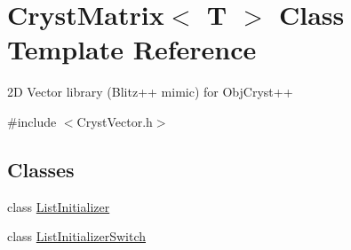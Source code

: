 \hypertarget{class_cryst_matrix}{}\section{Cryst\+Matrix$<$ T $>$ Class Template Reference}
\label{class_cryst_matrix}


2D Vector library (Blitz++ mimic) for Obj\+Cryst++  




{\ttfamily \#include $<$Cryst\+Vector.\+h$>$}

\subsection*{Classes}
\begin{DoxyCompactItemize}
\item 
class \mbox{\hyperlink{class_cryst_matrix_1_1_list_initializer}{List\+Initializer}}
\item 
class \mbox{\hyperlink{class_cryst_matrix_1_1_list_initializer_switch}{List\+Initializer\+Switch}}
\end{DoxyCompactItemize}
